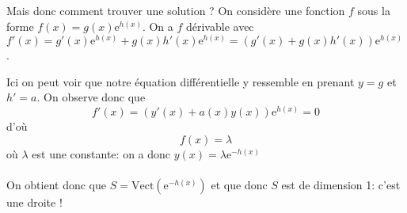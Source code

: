 \documentclass{classe}
\begin{document}
Mais donc comment trouver une solution ? On considère une fonction $f$ sous la forme $f(x) = g(x)\mathrm{e}^{h(x)}$. On a $f$ dérivable avec $f'(x) = g'(x)\mathrm{e}^{h(x)} + g(x)h'(x)\mathrm{e}^{h(x)} = (g'(x) + g(x)h'(x))\mathrm{e}^{h(x)}$.

Ici on peut voir que notre équation différentielle y ressemble en prenant $y = g$ et $h' = a$. On observe donc que
$$f'(x) = (y'(x) + a(x)y(x))\mathrm{e}^{h(x)} = 0$$
d'où
$$f(x) = \lambda$$
où $\lambda$ est une constante: on a donc $y(x) = \lambda\mathrm{e}^{-h(x)}$
\\\\
On obtient donc que $S = \mathrm{Vect}(\mathrm{e}^{-h(x)})$ et que donc $S$ est de dimension 1: c'est une droite !
\end{document}

